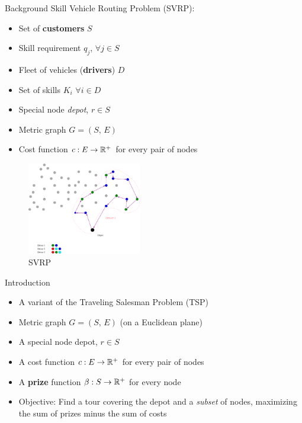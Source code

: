 \begin{frame}[t]{Background}
    Skill Vehicle Routing Problem (SVRP):
    \begin{minipage}[t]{0.48\textwidth}
        \begin{itemize}
            \item Set of \textbf{customers} $S$
            \item Skill requirement $q_j$,  $\forall j \in S$
            \item Fleet of vehicles (\textbf{drivers}) $D$
            \item Set of skills $K_i$ $\forall i \in D$
            \item Special node \emph{depot}, $r \in S$
            \item Metric graph $G = (S, \, E)$            
            \item Cost function $c:E \rightarrow \mathbb{R}^+$ for every pair of nodes
        \end{itemize}
    \end{minipage}
    \begin{minipage}[t]{0.48\textwidth}
        \begin{figure}
            \centering
            \includegraphics[width=5cm]{VRPSS03.pdf}
            \caption{SVRP}
            \label{fig:VRPSS02}
        \end{figure}            
    \end{minipage}    
\end{frame}


\begin{frame}[t]{Introduction}

\begin{itemize}
    \item<1-> A variant of the Traveling Salesman Problem (TSP)
    \item<2-> Metric graph $G = (S, \, E)$ (on a Euclidean plane) 
    \item<3-> A special node depot, $r \in S$
    \item<4-> A cost function $c:E \rightarrow \mathbb{R}^+$ for every pair of nodes
    \item<5-> A \textbf{prize} function $\beta:S \rightarrow \mathbb{R}^+$ for every node
    \item<6-> Objective: Find a tour covering the depot and a \emph{subset} of nodes, maximizing the sum of prizes minus the sum of costs
\end{itemize}
\end{frame}

